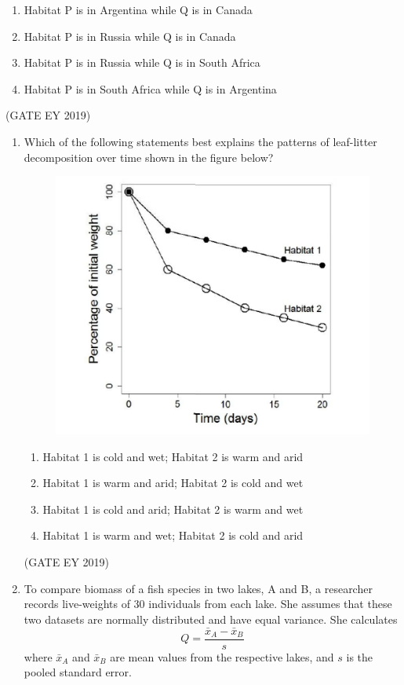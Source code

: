 \documentclass[journal,12pt,onecolumn]{IEEEtran}
\theoremstyle{remark}
\begin{document}
\begin{enumerate}[leftmargin=*]
\begin{enumerate}[nosep]

\item Habitat P is in Argentina while Q is in Canada
\item Habitat P is in Russia while Q is in Canada
\item Habitat P is in Russia while Q is in South Africa
\item Habitat P is in South Africa while Q is in Argentina
\end{enumerate}


\end{enumerate}
\hfill{(GATE EY 2019)}


\begin{enumerate}[resume]
\item Which of the following statements best explains the patterns of leaf-litter decomposition over time shown in the figure below?

\begin{figure}[H]
    \centering
    \includegraphics[]{figs/15.png}
\end{figure}

\begin{enumerate}[nosep]
\item Habitat 1 is cold and wet; Habitat 2 is warm and arid
\item Habitat 1 is warm and arid; Habitat 2 is cold and wet
\item Habitat 1 is cold and arid; Habitat 2 is warm and wet
\item Habitat 1 is warm and wet; Habitat 2 is cold and arid
\end{enumerate}
\hfill{(GATE EY 2019)}
\item To compare biomass of a fish species in two lakes, A and B, a researcher records live-weights of 30 individuals from each lake. She assumes that these two datasets are normally distributed and have equal variance. She calculates
\[
Q=\frac{\bar{x}_A-\bar{x}_B}{s}
\]
where $\bar{x}_A$ and $\bar{x}_B$ are mean values from the respective lakes, and $s$ is the pooled standard error.  


\end{enumerate}
\end{document}
